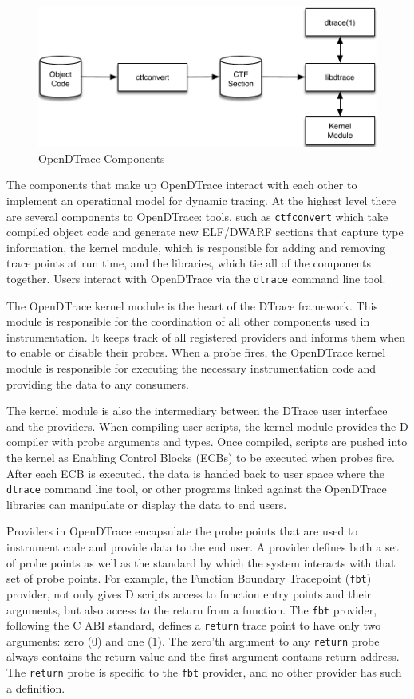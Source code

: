 \begin{figure}[htpb]
	\centering
	\includegraphics[width=0.8\linewidth]{toplevelarch.pdf}
	\caption{OpenDTrace Components}
	\label{fig:components}
\end{figure}

The components that make up OpenDTrace interact with each other to
implement an operational model for dynamic tracing.  At the highest
level there are several components to OpenDTrace: tools, such as
\texttt{ctfconvert} which take compiled object code and generate new
ELF/DWARF sections that capture type information, the kernel module,
which is responsible for adding and removing trace points at run time,
and the libraries, which tie all of the components together.  Users
interact with OpenDTrace via the \texttt{dtrace} command line tool.

The OpenDTrace kernel module is the heart of the DTrace
framework. This module is responsible for the coordination of all
other components used in instrumentation. It keeps track of all
registered providers and informs them when to enable or disable their
probes. When a probe fires, the OpenDTrace kernel module is
responsible for executing the necessary instrumentation code and
providing the data to any consumers.

The kernel module is also the intermediary between the DTrace user
interface and the providers. When compiling user scripts, the kernel
module provides the D compiler with probe arguments and types. Once
compiled, scripts are pushed into the kernel as Enabling Control Blocks
(ECBs) to be executed when probes fire. After each ECB is executed,
the data is handed back to user space where the \texttt{dtrace}
command line tool, or other programs linked against the OpenDTrace
libraries can manipulate or display the data to end users.

Providers in OpenDTrace encapsulate the probe points that are used to
instrument code and provide data to the end user. A provider defines
both a set of probe points as well as the standard by which the system
interacts with that set of probe points.  For example, the Function
Boundary Tracepoint (\texttt{fbt}) provider, not only gives D scripts
access to function entry points and their arguments, but also access
to the return from a function.  The \texttt{fbt} provider, following
the C ABI standard, defines a \texttt{return} trace point to have only
two arguments: zero ($0$) and one ($1$).  The zero'th argument to any
\texttt{return} probe always contains the return value and the first
argument contains return address.  The \texttt{return} probe is
specific to the \texttt{fbt} provider, and no other provider has such
a definition.

